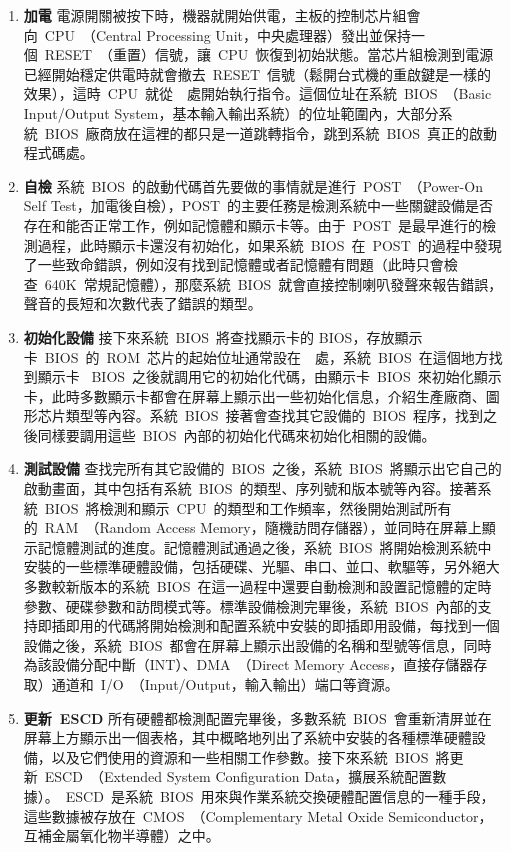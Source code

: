 \begin{enumerate}
\item{\textbf{加電}} 電源開關被按下時，機器就開始供電，主板的控制芯片組會向~CPU~（Central Processing Unit，中央處理器）發出並保持一個~RESET~（重置）信號，讓~CPU~恢復到初始狀態。當芯片組檢測到電源已經開始穩定供電時就會撤去~RESET~信號（鬆開台式機的重啟鍵是一樣的效果），這時~CPU~就從~~處開始執行指令。這個位址在系統~BIOS~（Basic Input/Output System，基本輸入輸出系統）的位址範圍內，大部分系統~BIOS~廠商放在這裡的都只是一道跳轉指令，跳到系統~BIOS~真正的啟動程式碼處。

\item{\textbf{自檢}} 系統~BIOS~的啟動代碼首先要做的事情就是進行~POST~（Power-On Self Test，加電後自檢），POST~的主要任務是檢測系統中一些關鍵設備是否存在和能否正常工作，例如記憶體和顯示卡等。由于~POST~是最早進行的檢測過程，此時顯示卡還沒有初始化，如果系統~BIOS~在~POST~的過程中發現了一些致命錯誤，例如沒有找到記憶體或者記憶體有問題（此時只會檢查~640K~常規記憶體），那麼系統~BIOS~就會直接控制喇叭發聲來報告錯誤，聲音的長短和次數代表了錯誤的類型。

\item{\textbf{初始化設備}} 接下來系統~BIOS~將查找顯示卡的 BIOS，存放顯示卡~BIOS~的~ROM~芯片的起始位址通常設在~~處，系統~BIOS~在這個地方找到顯示卡 ~BIOS~之後就調用它的初始化代碼，由顯示卡~BIOS~來初始化顯示卡，此時多數顯示卡都會在屏幕上顯示出一些初始化信息，介紹生產廠商、圖形芯片類型等內容。系統~BIOS~接著會查找其它設備的~BIOS~程序，找到之後同樣要調用這些~BIOS~內部的初始化代碼來初始化相關的設備。

\item{\textbf{測試設備}} 查找完所有其它設備的~BIOS~之後，系統~BIOS~將顯示出它自己的啟動畫面，其中包括有系統~BIOS~的類型、序列號和版本號等內容。接著系統~BIOS~將檢測和顯示~CPU~的類型和工作頻率，然後開始測試所有的~RAM~（Random Access Memory，隨機訪問存儲器），並同時在屏幕上顯示記憶體測試的進度。記憶體測試通過之後，系統~BIOS~將開始檢測系統中安裝的一些標準硬體設備，包括硬碟、光驅、串口、並口、軟驅等，另外絕大多數較新版本的系統~BIOS~在這一過程中還要自動檢測和設置記憶體的定時參數、硬碟參數和訪問模式等。標準設備檢測完畢後，系統~BIOS~內部的支持即插即用的代碼將開始檢測和配置系統中安裝的即插即用設備，每找到一個設備之後，系統~BIOS~都會在屏幕上顯示出設備的名稱和型號等信息，同時為該設備分配中斷（INT）、DMA~（Direct Memory Access，直接存儲器存取）通道和~I/O~（Input/Output，輸入輸出）端口等資源。

\item{\textbf{更新~ESCD}} 所有硬體都檢測配置完畢後，多數系統~BIOS~會重新清屏並在屏幕上方顯示出一個表格，其中概略地列出了系統中安裝的各種標準硬體設備，以及它們使用的資源和一些相關工作參數。接下來系統~BIOS~將更新~ESCD~（Extended System Configuration Data，擴展系統配置數據）。~ESCD~是系統~BIOS~用來與作業系統交換硬體配置信息的一種手段，這些數據被存放在~CMOS~（Complementary Metal Oxide Semiconductor，互補金屬氧化物半導體）之中。


\end{enumerate}
